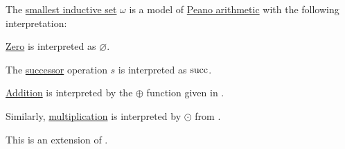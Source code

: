 \begin{theorem}\label{thm:omega_is_model_of_pa}
  The \hyperref[thm:smallest_inductive_set_existence]{smallest inductive set} \( \omega \) is a model of \hyperref[def:peano_arithmetic]{Peano arithmetic} with the following interpretation:
  \begin{thmenum}
     \hyperref[def:peano_arithmetic/zero]{Zero} is interpreted as \( \varnothing \).

     The \hyperref[def:peano_arithmetic/succ]{successor} operation \( s \) is interpreted as \( \operatorname{succ} \).

     \hyperref[def:peano_arithmetic/plus]{Addition} is interpreted by the \( \oplus \) function given in .

     Similarly, \hyperref[def:peano_arithmetic/mult]{multiplication} is interpreted by \( \odot \) from .
  \end{thmenum}
\end{theorem}
\begin{comments}
  \item This is an extension of .
\end{comments}
